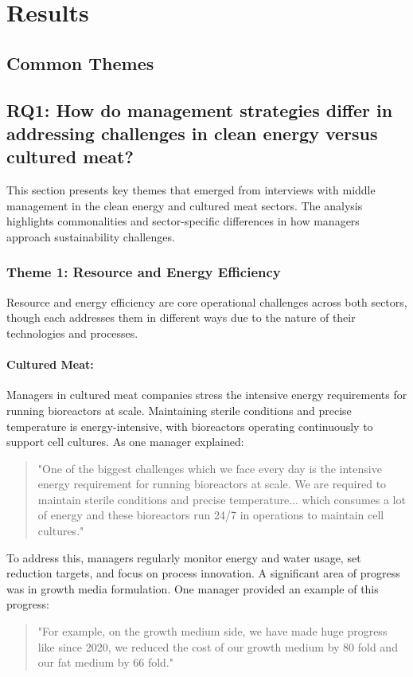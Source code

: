 
\section{Results}

\subsection*{Common Themes}

\subsection{RQ1: How do management strategies differ in addressing challenges in clean energy versus cultured meat?}
This section presents key themes that emerged from interviews with middle management in the clean energy and cultured meat sectors. The analysis highlights commonalities and sector-specific differences in how managers approach sustainability challenges.

\subsubsection{Theme 1: Resource and Energy Efficiency}
Resource and energy efficiency are core operational challenges across both sectors, though each addresses them in different ways due to the nature of their technologies and processes.

\paragraph{Cultured Meat:} Managers in cultured meat companies stress the intensive energy requirements for running bioreactors at scale. Maintaining sterile conditions and precise temperature is energy-intensive, with bioreactors operating continuously to support cell cultures. As one manager explained:
\begin{quote}
	"One of the biggest challenges which we face every day is the intensive energy requirement for running bioreactors at scale. We are required to maintain sterile conditions and precise temperature... which consumes a lot of energy and these bioreactors run 24/7 in operations to maintain cell cultures."
\end{quote}
To address this, managers regularly monitor energy and water usage, set reduction targets, and focus on process innovation. A significant area of progress was in growth media formulation. One manager provided an example of this progress:
\begin{quote}
	"For example, on the growth medium side, we have made huge progress like since 2020, we reduced the cost of our growth medium by 80 fold and our fat medium by 66 fold."
\end{quote}

